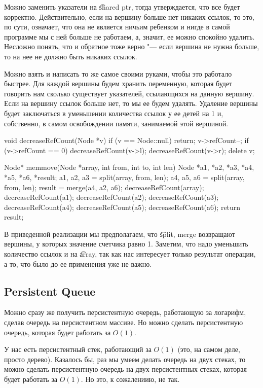 Можно заменить указатели на \t{shared ptr}, тогда утверждается, что все будет корректно.
Действительно, если на вершину больше нет никаких ссылок, то это, по сути, означает, 
что она не является ничьим ребенком и нигде в самой программе мы с ней больше не работаем, а,
значит, ее можно спокойно удалить. Несложно понять, что и обратное тоже верно "--- если вершина
не нужна больше, то на нее не должно быть никаких ссылок.

Можно взять и написать то же самое своими руками, чтобы это работало быстрее. 
Для каждой вершины будем хранить переменную,
которая будет говорить нам сколько существует указателей, ссылающихся на данную вершину.
Если на вершину ссылок больше нет, то мы ее будем удалять. 
Удаление вершины будет заключаться в уменьшении количества ссылок у
ее детей на 1 и, собственно, в самом освобождении памяти, занимаемой этой вершиной.

\begin{cppcode}
void decreaseRefCount(Node *v) {
    if (v == Node::null)
        return;
    v->refCount--;
    if (v->refCount == 0) {
        decreaseRefCount(v->l);
        decreaseRefCount(v->r);
        delete v;
    }    
}

Node* memmove(Node *array, int from, int to, int len) {
    Node *a1, *a2, *a3, *a4, *a5, *a6, *result;
    a1, a2, a3 = split(array, from, len);
    a4, a5, a6 = split(array, from, len);
    result = merge(a4, a2, a6);
    decreaseRefCount(array);
    decreaseRefCount(a1);
    decreaseRefCount(a2);
    decreaseRefCount(a3);
    decreaseRefCount(a4);
    decreaseRefCount(a5);
    decreaseRefCount(a6);
    return result;       
}
\end{cppcode}

В приведенной реализации мы предполагаем, что \t{split, merge} возвращают вершины, 
у которых значение счетчика равно 1. Заметим, что надо уменьшить количество ссылок и на
\t{array}, так как нас интересует только результат операции, а то, что было до ее применения
уже не важно. 

\subsection{Persistent Queue}

Можно сразу же получить персистентную очередь, работающую за логарифм, сделав очередь на
персистентном массиве. 
Но можно сделать персистентную очередь, которая будет работать за $O(1)$. 

У нас есть персистентный стек, работающий за $O(1)$ (это, на самом деле, просто дерево).
Казалось бы, раз мы умеем делать очередь на двух стеках, то можно сделать персистентную очередь
на двух персистентных стеках, которая будет работать за $O(1)$. 
Но это, к сожалениию, не так.

